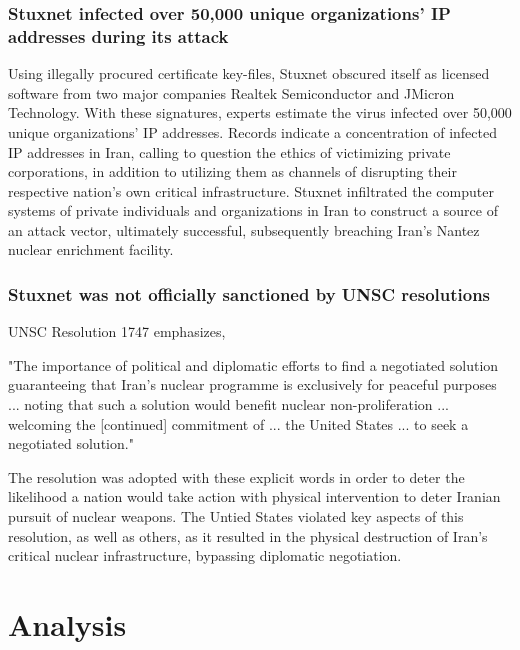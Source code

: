 \documentclass[12pt]{article}
\begin{document}
\begin{multicols}{2}
\subsubsection{Stuxnet infected over 50,000 unique organizations' IP addresses during its attack}

Using illegally procured certificate key-files, Stuxnet obscured itself as licensed software from two major companies Realtek Semiconductor and JMicron Technology. With these signatures, experts estimate the virus infected over 50,000 unique organizations' IP addresses.\cite{lessonsFromStuxnet} Records indicate a concentration of infected IP addresses in Iran, calling to question the ethics of victimizing private corporations, in addition to  utilizing them as channels of disrupting their respective nation's own critical infrastructure. Stuxnet infiltrated the computer systems of private individuals and organizations in Iran to construct a source of an attack vector, ultimately successful, subsequently breaching Iran's Nantez nuclear enrichment facility.\cite{w32.stuxnetDossier} 

\subsubsection{Stuxnet was not officially sanctioned by UNSC resolutions}

UNSC Resolution 1747 emphasizes,
\begin{displayquote}
"The importance of political and diplomatic efforts to find a negotiated solution guaranteeing that Iran’s nuclear programme is exclusively for peaceful purposes ... noting that such a solution would benefit nuclear non-proliferation ... welcoming the [continued] commitment of ... the United States ... to seek a negotiated solution."\cite{resolution1747}
\end{displayquote}

The resolution was adopted with these explicit words in order to deter the likelihood a nation would take action with physical intervention to deter Iranian pursuit of nuclear weapons. The Untied States violated key aspects of this resolution, as well as others, as it resulted in the physical destruction of Iran's critical nuclear infrastructure, bypassing diplomatic negotiation.


\section{Analysis}


\end{multicols}
\end{document}
